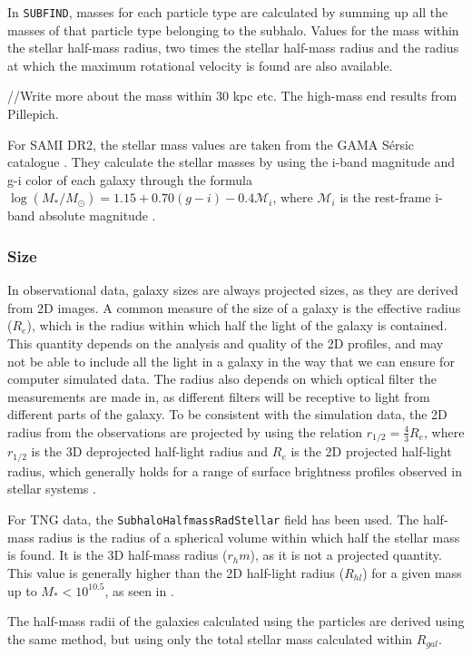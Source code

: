 In \texttt{SUBFIND}, masses for each particle type are calculated by summing up all the masses of that particle type belonging to the subhalo. Values for the mass within the stellar half-mass radius, two times the stellar half-mass radius and the radius at which the maximum rotational velocity is found are also available.

//Write more about the mass within 30 kpc etc. The high-mass end results from Pillepich. 

For SAMI DR2, the stellar mass values are taken from the GAMA Sérsic catalogue \parencite{Driver2011}. They calculate the stellar masses by using the i-band magnitude and g-i color of each galaxy through the formula $\log(M_*/M_\odot) = 1.15 + 0.70(g-i) -0.4\mathcal{M}_i$, where $\mathcal{M}_i$ is the rest-frame i-band absolute magnitude \parencite{Taylor2011}.

\subsubsection{Size}

In observational data, galaxy sizes are always projected sizes, as they are derived from 2D images. A common measure of the size of a galaxy is the effective radius ($R_e$), which is the radius within which half the light of the galaxy is contained. This quantity depends on the analysis and quality of the 2D profiles, and may not be able to include all the light in a galaxy in the way that we can ensure for computer simulated data. The radius also depends on which optical filter the measurements are made in, as different filters will be receptive to light from different parts of the galaxy. To be consistent with the simulation data, the 2D radius from the observations are projected by using the relation $r_{1/2} = \frac{4}{3}R_{e}$, where $r_{1/2}$ is the 3D deprojected half-light radius and $R_e$ is the 2D projected half-light radius, which generally holds for a range of surface brightness profiles observed in stellar systems \parencite{Wolf2010}.

For TNG data, the \texttt{SubhaloHalfmassRadStellar} field has been used. The half-mass radius is the radius of a spherical volume within which half the stellar mass is found. It is the 3D half-mass radius ($r_hm$), as it is not a projected quantity. This value is generally higher than the 2D half-light radius ($R_{hl}$) for a given mass up to $M_{*} < 10^{10.5}$, as seen in \textcite{Genel2017}. 

The half-mass radii of the galaxies calculated using the particles are derived using the same method, but using only the total stellar mass calculated within $R_{gal}$.

